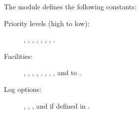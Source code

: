 The module defines the following constants:

\begin{description}

\item[Priority levels (high to low):]

, , , ,
, , , .

\item[Facilities:]

, , , ,
, , , ,
 and  to .

\item[Log options:]

, , , 
and  if defined in .

\end{description}
